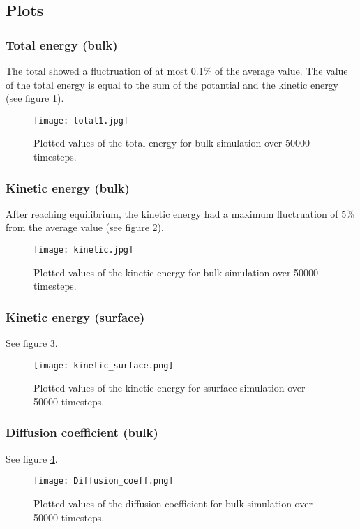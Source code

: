 \subsection{Plots}
\subsubsection{Total energy (bulk)}
The total showed a fluctruation of at most 0.1\% of the average value. The value of the total energy is equal to the sum of the potantial and the kinetic energy (see figure  \ref{totale}).
\begin{figure}[h]
	\centering
	\texttt{[image: total1.jpg]}
	\caption{Plotted values of the total energy for bulk simulation over 50000 timesteps.}
	\label{totale}
\end{figure}

\subsubsection{Kinetic energy (bulk)}
After reaching equilibrium, the kinetic energy had a maximum fluctruation of 5\% from the average value (see figure \ref{kinetic}).
\begin{figure}[H]
	\centering
	\texttt{[image: kinetic.jpg]}
	\caption{Plotted values of the kinetic energy for bulk simulation over 50000 timesteps.}
	\label{kinetic}
\end{figure}

\subsubsection{Kinetic energy (surface)}
See figure \ref{kineticsf}.
\begin{figure}[h]
	\centering
	\texttt{[image: kinetic\_surface.png]}
	\caption{Plotted values of the kinetic energy for ssurface simulation over 50000 timesteps.}
	\label{kineticsf}
\end{figure}

\subsubsection{Diffusion coefficient (bulk)}
See figure \ref{diff}.
\begin{figure}[h]
	\centering
	\texttt{[image: Diffusion\_coeff.png]}
	\caption{Plotted values of the diffusion coefficient for bulk simulation over 50000 timesteps.}
	\label{diff}
\end{figure}

